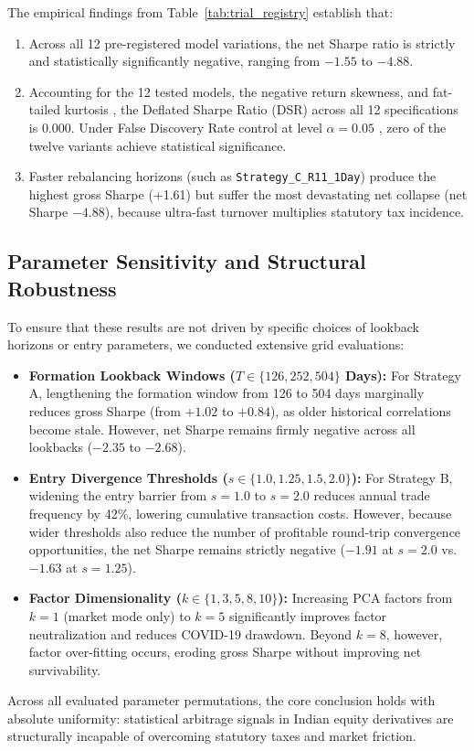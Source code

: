 \documentclass[11pt,a4paper]{article}
\begin{document}
The empirical findings from Table~\ref{tab:trial_registry} establish that:
\begin{enumerate}
    \item Across all 12 pre-registered model variations, the net Sharpe ratio is strictly and statistically significantly negative, ranging from $-1.55$ to $-4.88$.
    \item Accounting for the 12 tested models, the negative return skewness, and fat-tailed kurtosis \citep{bailey2014deflated}, the Deflated Sharpe Ratio (DSR) across all 12 specifications is $0.000$. Under False Discovery Rate control at level $\alpha = 0.05$ \citep{benjamini1995controlling}, zero of the twelve variants achieve statistical significance.
    \item Faster rebalancing horizons (such as \texttt{Strategy\_C\_R11\_1Day}) produce the highest gross Sharpe (+1.61) but suffer the most devastating net collapse (net Sharpe $-4.88$), because ultra-fast turnover multiplies statutory tax incidence.
\end{enumerate}

\subsection{Parameter Sensitivity and Structural Robustness}
To ensure that these results are not driven by specific choices of lookback horizons or entry parameters, we conducted extensive grid evaluations:
\begin{itemize}
    \item \textbf{Formation Lookback Windows ($T \in \{126, 252, 504\}$ Days):} For Strategy A, lengthening the formation window from 126 to 504 days marginally reduces gross Sharpe (from $+1.02$ to $+0.84$), as older historical correlations become stale. However, net Sharpe remains firmly negative across all lookbacks ($-2.35$ to $-2.68$).
    \item \textbf{Entry Divergence Thresholds ($s \in \{1.0, 1.25, 1.5, 2.0\}$):} For Strategy B, widening the entry barrier from $s=1.0$ to $s=2.0$ reduces annual trade frequency by 42\%, lowering cumulative transaction costs. However, because wider thresholds also reduce the number of profitable round-trip convergence opportunities, the net Sharpe remains strictly negative ($-1.91$ at $s=2.0$ vs.\ $-1.63$ at $s=1.25$).
    \item \textbf{Factor Dimensionality ($k \in \{1, 3, 5, 8, 10\}$):} Increasing PCA factors from $k=1$ (market mode only) to $k=5$ significantly improves factor neutralization and reduces COVID-19 drawdown. Beyond $k=8$, however, factor over-fitting occurs, eroding gross Sharpe without improving net survivability.
\end{itemize}
Across all evaluated parameter permutations, the core conclusion holds with absolute uniformity: statistical arbitrage signals in Indian equity derivatives are structurally incapable of overcoming statutory taxes and market friction.
\end{document}
